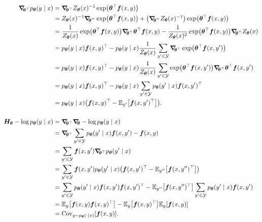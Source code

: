 \begin{align*}
  \grad{p_{\vec{\theta}}(y\mid x)}{\transpose{\vec{\theta}}} &= \grad{Z_{\vec{\theta}}(x)^{-1} \exp \lft( \transpose{\vec{\theta}} \vec{f}(x,y) \rgt)}{\transpose{\vec{\theta}}} \\
  &= Z_{\vec{\theta}}(x)^{-1} \grad{\exp \lft( \transpose{\vec{\theta}} \vec{f}(x,y) \rgt)}{\transpose{\vec{\theta}}} + \lft( \grad{Z_{\vec{\theta}}(x)^{-1}}{\transpose{\vec{\theta}}} \rgt) \exp \lft( \transpose{\vec{\theta}} \vec{f}(x,y) \rgt) \\
  &= \frac{1}{Z_{\vec{\theta}}(x)} \exp \lft( \transpose{\vec{\theta}} \vec{f}(x,y) \rgt) \grad{\transpose{\vec{\theta}} \vec{f}(x,y)}{\transpose{\vec{\theta}}} - \frac{1}{Z_{\vec{\theta}}(x)^2} \exp \lft( \transpose{\vec{\theta}} \vec{f}(x,y) \rgt) \grad{Z_{\vec{\theta}}(x)}{\transpose{\vec{\theta}}} \\
  &= p_{\vec{\theta}}(y\mid x) \transpose{\vec{f}(x,y)} - p_{\vec{\theta}}(y\mid x) \frac{1}{Z_{\vec{\theta}}(x)} \sum_{y'\in\mathcal{Y}} \grad{\exp \lft( \transpose{\vec{\theta}} \vec{f}(x,y') \rgt)}{\transpose{\vec{\theta}}} \\
  &= p_{\vec{\theta}}(y\mid x) \transpose{\vec{f}(x,y)} - p_{\vec{\theta}}(y\mid x) \frac{1}{Z_{\vec{\theta}}(x)} \sum_{y'\in\mathcal{Y}} \exp \lft( \transpose{\vec{\theta}} \vec{f}(x,y') \rgt) \grad{\transpose{\vec{\theta}} \vec{f}(x,y')}{\transpose{\vec{\theta}}} \\
  &= p_{\vec{\theta}}(y\mid x) \transpose{\vec{f}(x,y)} - p_{\vec{\theta}}(y\mid x) \sum_{y'\in\mathcal{Y}} p_{\vec{\theta}}(y'\mid x) \transpose{\vec{f}(x,y')} \\
  &= p_{\vec{\theta}}(y\mid x) \lft( \transpose{\vec{f}(x,y)} - \E_{y'} \lft[ \transpose{\vec{f}(x,y')} \rgt] \rgt). \\
  \\
  \hess{-\log p_{\vec{\theta}}(y\mid x)}{\vec{\theta}} &= \grad{ \grad{-\log p_{\vec{\theta}}(y\mid x)}{\vec{\theta}} }{\transpose{\vec{\theta}}} \\
  &= \grad{\sum_{y'\in\mathcal{Y}} p_{\vec{\theta}}(y'\mid x) \vec{f}(x,y') - \vec{f}(x,y)}{\transpose{\vec{\theta}}} \\
  &= \sum_{y'\in\mathcal{Y}} \vec{f}(x,y') \grad{p_{\vec{\theta}}(y'\mid x)}{\transpose{\vec{\theta}}} \\
  &= \sum_{y'\in\mathcal{Y}} \vec{f}(x,y') p_{\vec{\theta}}(y'\mid x) \lft( \transpose{\vec{f}(x,y')} - \E_{y''} \lft[ \transpose{\vec{f}(x,y'')} \rgt] \rgt) \\
  &= \sum_{y'\in\mathcal{Y}} p_{\vec{\theta}}(y'\mid x) \vec{f}(x,y') \transpose{\vec{f}(x,y')}  - \E_{y''} \lft[ \transpose{\vec{f}(x,y'')} \rgt] \sum_{y'\in\mathcal{Y}} p_{\vec{\theta}}(y'\mid x) \vec{f}(x,y') \\
  &= \E_y \lft[ \vec{f}(x,y) \transpose{\vec{f}(x,y)} \rgt]  - \E_y \lft[ \transpose{\vec{f}(x,y)} \rgt] \E_y \lft[ \vec{f}(x,y) \rgt] \\
  &= \mathrm{Cov}_{y \sim p_{\vec{\theta}}(\cdot\mid x)} \lft[ \vec{f}(x,y) \rgt]
.\end{align*}

